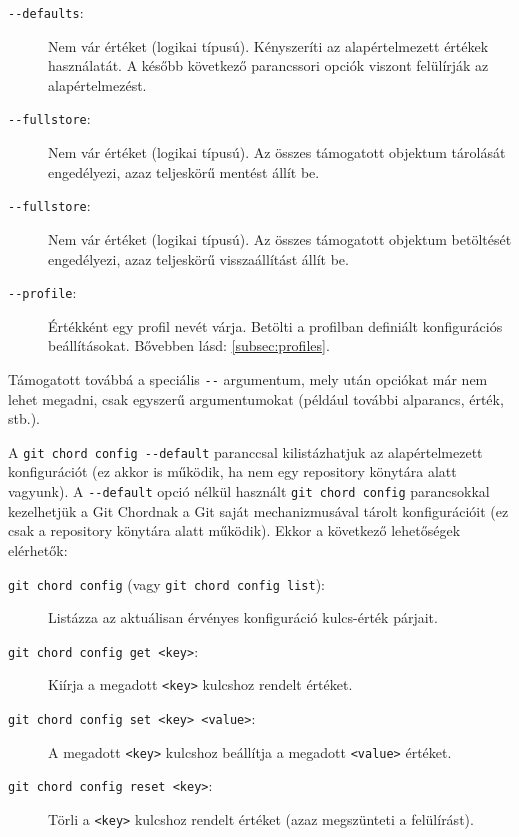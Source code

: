 \documentclass[final]{elteikthesis}[2025/03/25]
\begin{document}
\begin{description}
    \item[\texttt{{-}{-}defaults}:]
        Nem vár értéket (logikai típusú).
        Kényszeríti az alapértelmezett értékek használatát.
        A később következő parancssori opciók viszont felülírják az alapértelmezést.
    \item[\texttt{{-}{-}fullstore}:]
        Nem vár értéket (logikai típusú).
        Az összes támogatott objektum tárolását engedélyezi, azaz teljeskörű mentést állít be.
    \item[\texttt{{-}{-}fullstore}:]
        Nem vár értéket (logikai típusú).
        Az összes támogatott objektum betöltését engedélyezi, azaz teljeskörű visszaállítást állít be.
    \item[\texttt{{-}{-}profile}:]
        Értékként egy profil nevét várja.
        Betölti a profilban definiált konfigurációs beállításokat.
        Bővebben lásd: \ref{subsec:profiles}.
\end{description}

Támogatott továbbá a speciális \verb|--| argumentum, mely után opciókat már nem lehet megadni, csak egyszerű argumentumokat (például további alparancs, érték, stb.).

A \verb|git chord config --default| paranccsal kilistázhatjuk az alapértelmezett konfigurációt
(ez akkor is működik, ha nem egy repository könytára alatt vagyunk).
A \verb|--default| opció nélkül használt \verb|git chord config| parancsokkal kezelhetjük a Git Chordnak a Git saját mechanizmusával tárolt konfigurációit
(ez csak a repository könytára alatt működik).
Ekkor a következő lehetőségek elérhetők:

\begin{description}
    \item[\texttt{git chord config} (vagy \texttt{git chord config list}):]
        Listázza az aktuálisan érvényes konfiguráció kulcs-érték párjait.
    \item[\texttt{git chord config get <key>}:]
        Kiírja a megadott \verb|<key>| kulcshoz rendelt értéket.
    \item[\texttt{git chord config set <key> <value>}:]
        A megadott \verb|<key>| kulcshoz beállítja a megadott \verb|<value>| értéket.
    \item[\texttt{git chord config reset <key>}:]
        Törli a \verb|<key>| kulcshoz rendelt értéket (azaz megszünteti a felülírást).
\end{description}
\end{document}
